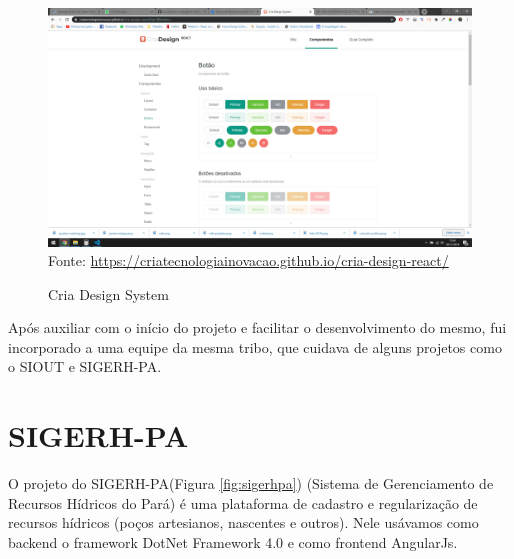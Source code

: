 \begin{figure}[H]
\centering
\caption{Cria Design System} %
\includegraphics[scale=0.3]{cria-design}\\  %
{\small Fonte: \url{https://criatecnologiainovacao.github.io/cria-design-react/}} %
\label{fig:criaDesign} %
\end{figure}

Após auxiliar com o início do projeto e facilitar o desenvolvimento do mesmo, fui incorporado a uma equipe da mesma tribo, que cuidava de alguns projetos como o SIOUT e SIGERH-PA.

\section{SIGERH-PA}

O projeto do SIGERH-PA(Figura \ref{fig:sigerhpa}) (Sistema de Gerenciamento de Recursos Hídricos do Pará) é uma plataforma de cadastro e regularização de recursos hídricos (poços artesianos, nascentes e outros).
Nele usávamos como backend o framework DotNet Framework 4.0 e como frontend AngularJs.

